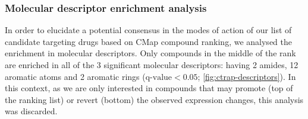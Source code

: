 \subsubsection{Molecular descriptor enrichment analysis}

In order to elucidate a potential consensus in the modes of action of our list of candidate targeting drugs based on CMap compound ranking, we analysed the enrichment in molecular descriptors. Only compounds in the middle of the rank are enriched in all of the 3 significant molecular descriptors: having 2 amides, 12 aromatic atoms and 2 aromatic rings ($\textrm{q-value} < 0.05$; \autoref{fig:ctrap-descriptors}). In this context, as we are only interested in compounds that may promote (top of the ranking list) or revert (bottom) the observed expression changes, this analysis was discarded.


